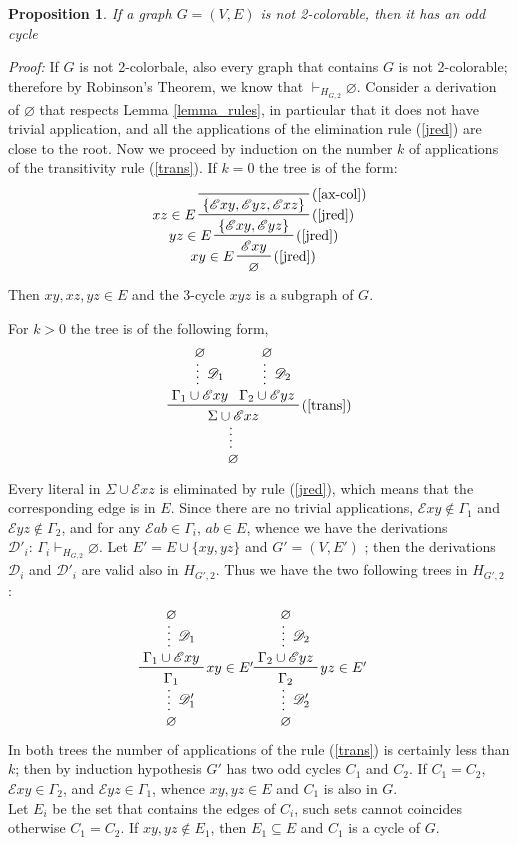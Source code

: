 \documentclass[a4paper,12pt,oneside]{book}
\newtheorem{proposition}[theorem]{Proposition}
\newcommand{\E}{\mathscr{E}}
\newcommand{\D}{\mathscr{D}}
\let\emptyset\varnothing
\begin{document}
\begin{proposition} \label{mio}
If a graph $G=(V,E)$ is not 2-colorable, then it has an odd cycle
\end{proposition}
\textit{Proof:}
If $G$ is not 2-colorbale, also every graph that contains $G$ is not 2-colorable; therefore by Robinson's Theorem, we know that  $\vdash_{H_{G,2}} \emptyset$. Consider a derivation of $\emptyset$  that respects Lemma \ref{lemma_rules}, in particular that it does not have trivial application, and all the applications of the elimination rule (\ref{jred}) are close to the root.
Now we proceed by induction on the number $k$ of applications of the transitivity rule (\ref{trans}).
If $k=0$ the tree is of the form:
\begin{eqnarray*}
\prftree[r,l]{(\ref{jred})}{$xy \in E$}{
\prftree[r,l]{(\ref{jred})}{$yz \in E$}{
\prftree[r,l]{(\ref{jred})}{$xz \in E$}{
\prftree[r]{(\ref{ax-col})} { }{ \{ \E xy , \E yz, \E xz  \} } } 
{\{ \E xy , \E yz \} } } 
{ \E xy  } }
{ \emptyset }
\end{eqnarray*}
Then $xy,xz,yz \in E$ and the 3-cycle $xyz$ is a subgraph of $G$.
 
For $k >0$ the tree is of the following form, 
$$
\prftree[r]{(\ref{trans})}
{\prfsummary[$\D_1$]{\emptyset}{\Gamma_1 \cup \E xy }}
{\prfsummary[$\D_2$]{\emptyset}{\Gamma_2 \cup \E yz }}
{\prfsummary{\Sigma \cup \E xz }{\emptyset}}
$$
Every literal in $\Sigma\cup\E xz$ is eliminated by rule (\ref{jred}), which means that the corresponding edge is in $E$. Since there are no trivial applications, $\E xy \notin \Gamma_1 $ and $\E yz \notin \Gamma_2 $, and for any $\E ab \in \Gamma_i$, $ab \in E$, whence we have the derivations $\D'_i:\,\Gamma_i \vdash_{H_{G,2}} \emptyset$. 
\newpage
Let $E'=E\cup\{xy,yz\}$ and $G'=(V,E' )$ ; then the derivations $\D_i$ and $\D'_i$ are valid also in $H_{G',2}$. Thus we have the two following trees in  $H_{G',2}$ :
\begin{eqnarray*}
\prfsummary[$\D'_1$]{
\prftree[r]{$xy \in E'$}{\prfsummary[$\D_1$]{\emptyset}{\Gamma_1 \cup \E xy}}{\Gamma_1}}
{\emptyset}
&\prfsummary[$\D'_2$]{
\prftree[r]{$yz \in E'$}{\prfsummary[$\D_2$]{\emptyset}{\Gamma_2 \cup\E yz}}{\Gamma_2}}
{\emptyset}
\end{eqnarray*}
In both trees the number of applications of the rule (\ref{trans}) is certainly less than $k$; then by induction hypothesis $G'$ has two odd cycles $C_1$ and $C_2$. If $C_1=C_2$, $\E xy \in \Gamma_2$, and $\E yz \in \Gamma_1$, whence $xy,yz\in E$ and $C_1$ is also in $G$.
\\Let $E_i$ be the set that contains the edges of $C_i$, such sets cannot coincides otherwise $C_1=C_2$.
If $xy,yz \notin E_1$, then $E_1\subseteq E$ and $C_1$ is a cycle of $G$. 
\end{document}
